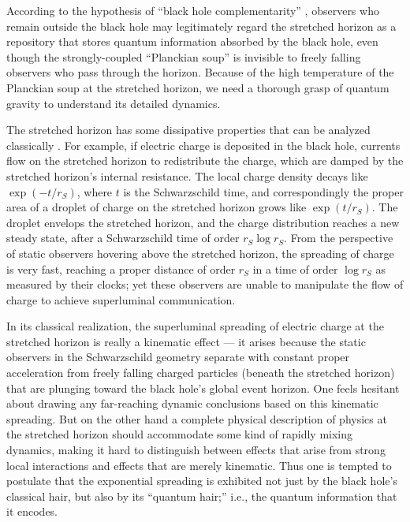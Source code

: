 \documentclass[12pt]{article}
\begin{document}
According to the hypothesis of ``black hole complementarity'' \cite{complement,susskind-book}, observers who remain outside the black hole may legitimately regard the stretched horizon as a repository that stores quantum information absorbed by the black hole, even though the strongly-coupled ``Planckian soup'' is invisible to freely falling observers who pass through the horizon. Because of the high temperature of the Planckian soup at the stretched horizon, we need a thorough grasp of quantum gravity to understand its detailed dynamics. 

The stretched horizon has some dissipative properties that can be analyzed classically \cite{membrane}. For example, if electric charge is deposited in the black hole, currents flow on the stretched horizon to redistribute the charge, which are damped by the stretched horizon's internal resistance. The local charge density decays like $\exp(-t/r_S)$, where $t$ is the Schwarzschild time, and correspondingly the proper area of a droplet of charge on the stretched horizon grows like $\exp(t/r_S)$. The droplet envelops the stretched horizon, and the charge distribution reaches a new steady state, after a Schwarzschild time of order $r_S\log r_S$. From the perspective of static observers hovering above the stretched horizon, the spreading of charge is very fast, reaching a proper distance of order $r_S$ in a time of order $\log r_S$ as measured by their clocks; yet these observers are unable to manipulate the flow of charge to achieve superluminal communication.

In its classical realization, the superluminal spreading of electric charge at the stretched horizon is really a kinematic effect --- it arises because the static observers in the Schwarzschild geometry separate with constant proper acceleration from freely falling charged particles (beneath the stretched horizon) that are plunging toward the black hole's global event horizon. One feels hesitant about drawing any far-reaching dynamic conclusions based on this kinematic spreading. But on the other hand a complete physical description of physics at the stretched horizon should accommodate some kind of rapidly mixing dynamics, making it hard to distinguish between effects that arise from strong local interactions and effects that are merely kinematic. Thus one is tempted to postulate that the exponential spreading is exhibited not just by the black hole's classical hair, but also by its ``quantum hair;''  i.e., the quantum information that it encodes. 
\end{document}
